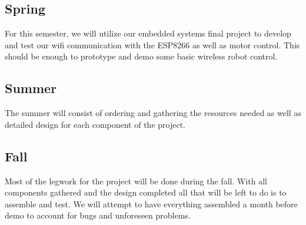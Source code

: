 \documentclass[11pt]{ieeeconf}
\begin{document}
\subsection{Spring}
For this semester, we will utilize our embedded systems final project to develop and test our wifi communication with the ESP8266 as well as motor control. This should be enough to prototype and demo some basic wireless robot control. 

\subsection{Summer}
The summer will consist of ordering and gathering the resources needed as well as detailed design for each component of the project. 

\subsection{Fall}
Most of the legwork for the project will be done during the fall. With all components gathered and the design completed all that will be left to do is to assemble and test. We will attempt to have everything assembled a month before demo to account for bugs and unforeseen problems.

% 
% 
\end{document}
